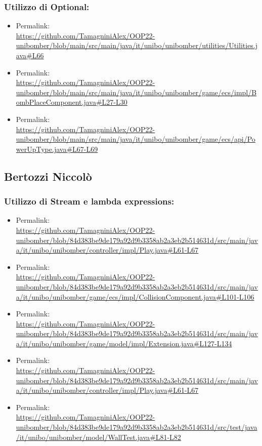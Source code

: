 \documentclass[a4paper,12pt]{report}
\begin{document}
\subsubsection*{Utilizzo di Optional:}
\begin{itemize}
    \item Permalink: 
    \\ \url{https://github.com/TamagniniAlex/OOP22-unibomber/blob/main/src/main/java/it/unibo/unibomber/utilities/Utilities.java#L66}
    \item Permalink: 
    \\ \url{https://github.com/TamagniniAlex/OOP22-unibomber/blob/main/src/main/java/it/unibo/unibomber/game/ecs/impl/BombPlaceComponent.java#L27-L30}
    \item Permalink: 
    \\ \url{https://github.com/TamagniniAlex/OOP22-unibomber/blob/main/src/main/java/it/unibo/unibomber/game/ecs/api/PowerUpType.java#L67-L69}
\end{itemize}
\subsection*{Bertozzi Niccolò}
\subsubsection*{Utilizzo di Stream e lambda expressions:}
\begin{itemize}
    \item Permalink: 
    \\ \url{https://github.com/TamagniniAlex/OOP22-unibomber/blob/84d383be9de179a92d9b3358ab2a3eb2b514631d/src/main/java/it/unibo/unibomber/controller/impl/Play.java#L61-L67}
    \item Permalink: 
    \\ \url{https://github.com/TamagniniAlex/OOP22-unibomber/blob/84d383be9de179a92d9b3358ab2a3eb2b514631d/src/main/java/it/unibo/unibomber/game/ecs/impl/CollisionComponent.java#L101-L106}
    \item Permalink: 
    \\ \url{https://github.com/TamagniniAlex/OOP22-unibomber/blob/84d383be9de179a92d9b3358ab2a3eb2b514631d/src/main/java/it/unibo/unibomber/game/model/impl/Extension.java#L127-L134}
    \item Permalink: 
    \\ \url{https://github.com/TamagniniAlex/OOP22-unibomber/blob/84d383be9de179a92d9b3358ab2a3eb2b514631d/src/main/java/it/unibo/unibomber/controller/impl/Play.java#L61-L67}
    \item Permalink: 
    \\ \url{https://github.com/TamagniniAlex/OOP22-unibomber/blob/84d383be9de179a92d9b3358ab2a3eb2b514631d/src/test/java/it/unibo/unibomber/model/WallTest.java#L81-L82}
\end{itemize}
\end{document}
